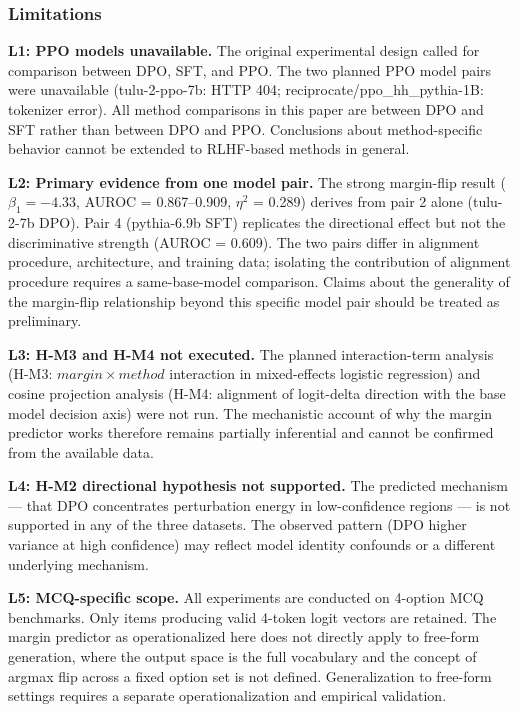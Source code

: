\subsubsection{Limitations}

\textbf{L1: PPO models unavailable.} The original experimental design called for comparison between DPO, SFT, and PPO. The two planned PPO model pairs were unavailable (tulu-2-ppo-7b: HTTP 404; reciprocate/ppo\_hh\_pythia-1B: tokenizer error). All method comparisons in this paper are between DPO and SFT rather than between DPO and PPO. Conclusions about method-specific behavior cannot be extended to RLHF-based methods in general.

\textbf{L2: Primary evidence from one model pair.} The strong margin-flip result ($\beta _1 = -4.33$, AUROC = 0.867--0.909, $\eta^2$ = 0.289) derives from pair 2 alone (tulu-2-7b DPO). Pair 4 (pythia-6.9b SFT) replicates the directional effect but not the discriminative strength (AUROC = 0.609). The two pairs differ in alignment procedure, architecture, and training data; isolating the contribution of alignment procedure requires a same-base-model comparison. Claims about the generality of the margin-flip relationship beyond this specific model pair should be treated as preliminary.

\textbf{L3: H-M3 and H-M4 not executed.} The planned interaction-term analysis (H-M3: $margin\times method$ interaction in mixed-effects logistic regression) and cosine projection analysis (H-M4: alignment of logit-delta direction with the base model decision axis) were not run. The mechanistic account of why the margin predictor works therefore remains partially inferential and cannot be confirmed from the available data.

\textbf{L4: H-M2 directional hypothesis not supported.} The predicted mechanism --- that DPO concentrates perturbation energy in low-confidence regions --- is not supported in any of the three datasets. The observed pattern (DPO higher variance at high confidence) may reflect model identity confounds or a different underlying mechanism.

\textbf{L5: MCQ-specific scope.} All experiments are conducted on 4-option MCQ benchmarks. Only items producing valid 4-token logit vectors are retained. The margin predictor as operationalized here does not directly apply to free-form generation, where the output space is the full vocabulary and the concept of argmax flip across a fixed option set is not defined. Generalization to free-form settings requires a separate operationalization and empirical validation.

